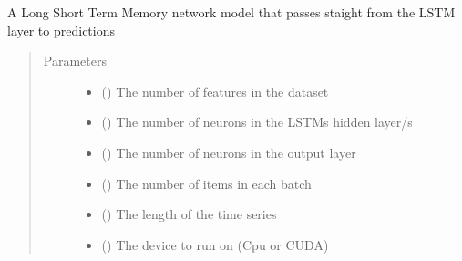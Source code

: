 \documentclass[letterpaper,10pt,english]{sphinxmanual}
\begin{document}
\begin{fulllineitems}
\begin{fulllineitems}
\begin{quote}
\begin{description}
\end{description}\end{quote}

\end{fulllineitems}


\end{fulllineitems}


\begin{fulllineitems}
\label{\detokenize{models:Foresight.models.LSTM_shallow}}
A Long Short Term Memory network model that passes staight
from the LSTM layer to predictions
\begin{quote}\begin{description}
\item[{Parameters}] \leavevmode\begin{itemize}
\item {} 
 () \textendash{} The number of features in the dataset

\item {} 
 () \textendash{} The number of neurons in the LSTMs hidden layer/s

\item {} 
 () \textendash{} The number of neurons in the output layer

\item {} 
 () \textendash{} The number of items in each batch

\item {} 
 () \textendash{} The length of the time series

\item {} 
 () \textendash{} The device to run on (Cpu or CUDA)


\end{itemize}
\end{description}
\end{quote}
\end{fulllineitems}
\end{document}

